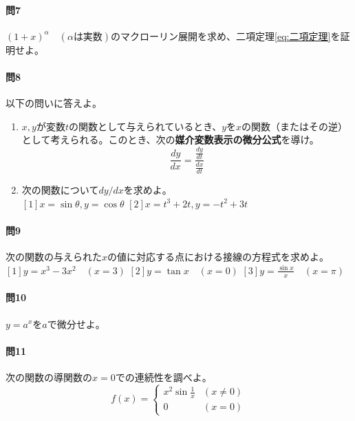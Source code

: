 \documentclass[a4j,dvipdfmx]{jsarticle}
\begin{document}
            \paragraph{問7}$(1+x)^{\alpha}\quad(\alpha\text{は実数})$のマクローリン展開を求め、二項定理\ref{eq:二項定理}を証明せよ。

            \paragraph{問8}以下の問いに答えよ。
                \begin{enumerate}\setcounter{enumi}{0}\renewcommand{\labelenumi}{(\arabic{enumi})}
                    \item $x,y$が変数$t$の関数として与えられているとき、$y$を$x$の関数（またはその逆）として考えられる。このとき、次の\textbf{媒介変数表示の微分公式}を導け。
                    \begin{equation}
                        \frac{dy}{dx}=\frac{\frac{dy}{dt}}{\frac{dx}{dt}}\label{eq:媒介変数の微分公式}
                    \end{equation}
                    \item 次の関数について$dy/dx$を求めよ。\\
                    $[1]x=\sin \theta,y=\cos\theta$\hspace{30mm}
                    $[2]x=t^3+2t,y=-t^2+3t$
                \end{enumerate}
            
            \paragraph{問9}次の関数の与えられた$x$の値に対応する点における接線の方程式を求めよ。\\
                $[1]y=x^3-3x^2\quad(x=3)$\hspace{10mm}
                $[2]y=\tan x\quad(x=0)$\hspace{10mm}
                $\displaystyle[3]y=\frac{\sin x}{x}\quad(x=\pi)$
            \paragraph{問10}$y=a^x$を$a$で微分せよ。

            \paragraph{問11}次の関数の導関数の$x=0$での連続性を調べよ。
                \begin{equation}
                    f(x)=\left\{\begin{array}{cc}
                        x^2\sin\frac{1}{x}&(x\neq 0)\\
                        0&(x=0)
                    \end{array}\right.
                \end{equation}
            \clearpage
\end{document}

